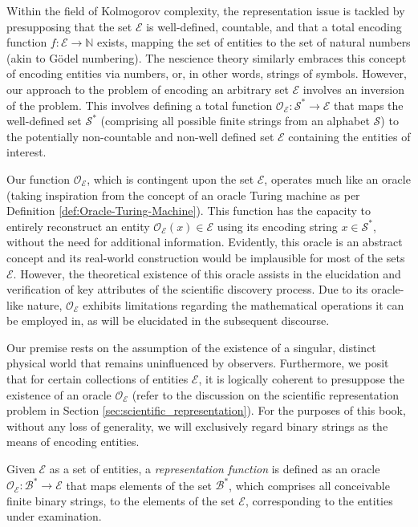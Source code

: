 Within the field of Kolmogorov complexity, the representation issue is tackled by presupposing that the set $\mathcal{E}$ is well-defined, countable, and that a total encoding function $f:\mathcal{E} \rightarrow \mathbb{N}$ exists, mapping the set of entities to the set of natural numbers (akin to Gödel numbering). The nescience theory similarly embraces this concept of encoding entities via numbers, or, in other words, strings of symbols. However, our approach to the problem of encoding an arbitrary set $\mathcal{E}$ involves an inversion of the problem. This involves defining a total function $\mathcal{O}_\mathcal{E}:\mathcal{S}^\ast \rightarrow \mathcal{E}$ that maps the well-defined set $\mathcal{S}^\ast$ (comprising all possible finite strings from an alphabet $\mathcal{S}$) to the potentially non-countable and non-well defined set $\mathcal{E}$ containing the entities of interest.

Our function $\mathcal{O}_\mathcal{E}$, which is contingent upon the set $\mathcal{E}$, operates much like an oracle (taking inspiration from the concept of an oracle Turing machine as per Definition \ref{def:Oracle-Turing-Machine}). This function has the capacity to entirely reconstruct an entity $\mathcal{O}_\mathcal{E} (x) \in \mathcal{E}$ using its encoding string $x \in \mathcal{S}^\ast$, without the need for additional information. Evidently, this oracle is an abstract concept and its real-world construction would be implausible for most of the sets $\mathcal{E}$. However, the theoretical existence of this oracle assists in the elucidation and verification of key attributes of the scientific discovery process. Due to its oracle-like nature, $\mathcal{O}_\mathcal{E}$ exhibits limitations regarding the mathematical operations it can be employed in, as will be elucidated in the subsequent discourse.

Our premise rests on the assumption of the existence of a singular, distinct physical world that remains uninfluenced by observers. Furthermore, we posit that for certain collections of entities $\mathcal{E}$, it is logically coherent to presuppose the existence of an oracle $\mathcal{O}_\mathcal{E}$ (refer to the discussion on the scientific representation problem in Section \ref{sec:scientific_representation}). For the purposes of this book, without any loss of generality, we will exclusively regard binary strings as the means of encoding entities.

\begin{definition}
\label{def:descriptions_topic}
Given $\mathcal{E}$ as a set of entities, a \emph{representation function} is defined as an oracle $\mathcal{O}_\mathcal{E}:\mathcal{B}^\ast \rightarrow \mathcal{E}$ that maps elements of the set $\mathcal{B}^\ast$, which comprises all conceivable finite binary strings, to the elements of the set $\mathcal{E}$, corresponding to the entities under examination.
\end{definition}

